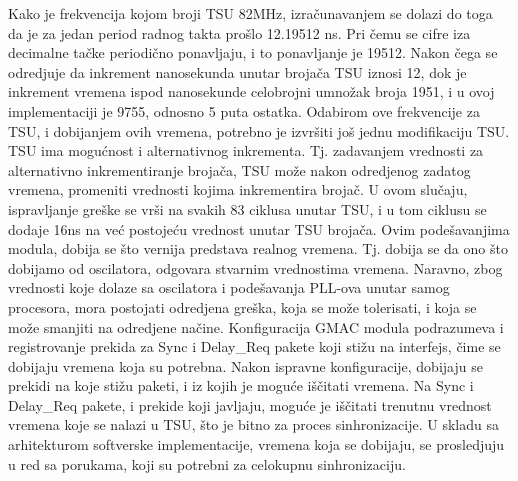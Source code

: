 \documentclass[a4paper,12pt, master]{etf}
\begin{document}
	Kako je frekvencija kojom broji TSU 82MHz, izra\v{c}unavanjem se dolazi do
	toga da je za jedan period radnog takta pro\v{s}lo 12.19512 ns. Pri \v{c}emu
    se cifre iza decimalne ta\v{c}ke periodi\v{c}no ponavljaju,  i to
    ponavljanje je 19512. Nakon \v{c}ega se odredjuje da inkrement nanosekunda
    unutar broja\v{c}a TSU iznosi 12, dok je inkrement vremena ispod nanosekunde
    celobrojni umno\v{z}ak broja 1951, i u ovoj implementaciji je 9755, odnosno
    5 puta ostatka. Odabirom ove frekvencije za TSU, i dobijanjem ovih vremena,
    potrebno je izvr\v{s}iti jo\v{s} jednu modifikaciju TSU\@. TSU ima mogu\'{c}nost
    i alternativnog inkrementa. Tj\@. zadavanjem vrednosti za alternativno
    inkrementiranje broja\v{c}a, TSU mo\v{z}e nakon odredjenog zadatog vremena,
    promeniti vrednosti kojima inkrementira broja\v{c}. U ovom slu\v{c}aju,
    ispravljanje gre\v{s}ke se vr\v{s}i na svakih 83 ciklusa unutar TSU, i u tom
    ciklusu se dodaje 16ns na ve\'{c} postoje\'{c}u vrednost unutar TSU
    broja\v{c}a. Ovim pode\v{s}avanjima modula, dobija se \v{s}to vernija
    predstava realnog vremena. Tj\@. dobija se da ono \v{s}to dobijamo od
    oscilatora, odgovara stvarnim vrednostima vremena. Naravno, zbog vrednosti
    koje dolaze sa oscilatora i pode\v{s}avanja PLL-ova unutar samog procesora,
    mora postojati odredjena gre\v{s}ka, koja se mo\v{z}e tolerisati, i koja se
    mo\v{z}e smanjiti na odredjene na\v{c}ine. Konfiguracija GMAC modula
    podrazumeva i registrovanje prekida za Sync i Delay\_Req pakete koji
    sti\v{z}u na interfejs, \v{c}ime se dobijaju vremena koja su potrebna. Nakon
    ispravne konfiguracije, dobijaju se prekidi na koje sti\v{z}u paketi, i iz
    kojih je mogu\'{c}e i\v{s}\v{c}itati vremena. Na Sync i Delay\_Req pakete,
    i prekide koji javljaju, mogu\'{c}e je i\v{s}\v{c}itati trenutnu vrednost
    vremena koje se nalazi u TSU, \v{s}to je bitno za proces sinhronizacije. U
    skladu sa arhitekturom softverske implementacije, vremena koja se dobijaju,
    se prosledjuju u red sa porukama, koji su potrebni za celokupnu
    sinhronizaciju.
\end{document}
